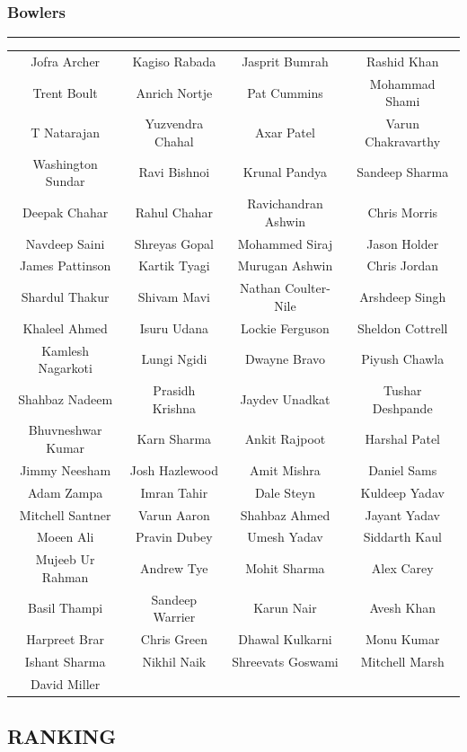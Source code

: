 \documentclass[12pt]{article}
\begin{document}
\subsubsection*{Bowlers}
\hrule
\begin{tabular}{c | c | c | c}
	Jofra Archer & Kagiso Rabada & Jasprit Bumrah & Rashid Khan\\
	Trent Boult & Anrich Nortje & Pat Cummins & Mohammad Shami \\
	T Natarajan & Yuzvendra Chahal & Axar Patel & Varun Chakravarthy \\
	Washington Sundar & Ravi Bishnoi & Krunal Pandya & Sandeep Sharma \\
	Deepak Chahar & Rahul Chahar & Ravichandran Ashwin & Chris Morris \\
	Navdeep Saini & Shreyas Gopal & Mohammed Siraj & Jason Holder \\
	James Pattinson & Kartik Tyagi & Murugan Ashwin & Chris Jordan \\
	Shardul Thakur & Shivam Mavi & Nathan Coulter-Nile & Arshdeep Singh \\
	Khaleel Ahmed &  Isuru Udana & Lockie Ferguson & Sheldon Cottrell \\
	Kamlesh Nagarkoti & Lungi Ngidi & Dwayne Bravo & Piyush Chawla \\
	Shahbaz Nadeem & Prasidh Krishna & Jaydev Unadkat & Tushar Deshpande\\
	Bhuvneshwar Kumar & Karn Sharma & Ankit Rajpoot & Harshal Patel \\
	Jimmy Neesham & Josh Hazlewood & Amit Mishra & Daniel Sams \\
	Adam Zampa & Imran Tahir & Dale Steyn & Kuldeep Yadav \\
	Mitchell Santner & Varun Aaron & Shahbaz Ahmed & Jayant Yadav \\
	Moeen Ali & Pravin Dubey & Umesh Yadav & Siddarth Kaul \\
	Mujeeb Ur Rahman & Andrew Tye & Mohit Sharma & Alex Carey \\
	Basil Thampi & Sandeep Warrier & Karun Nair & Avesh Khan \\
	Harpreet Brar & Chris Green & Dhawal Kulkarni & Monu Kumar \\
	Ishant Sharma & Nikhil Naik & Shreevats Goswami & Mitchell Marsh \\
	David Miller & & & \\
\end{tabular}


\subsection*{RANKING}
\end{document}
